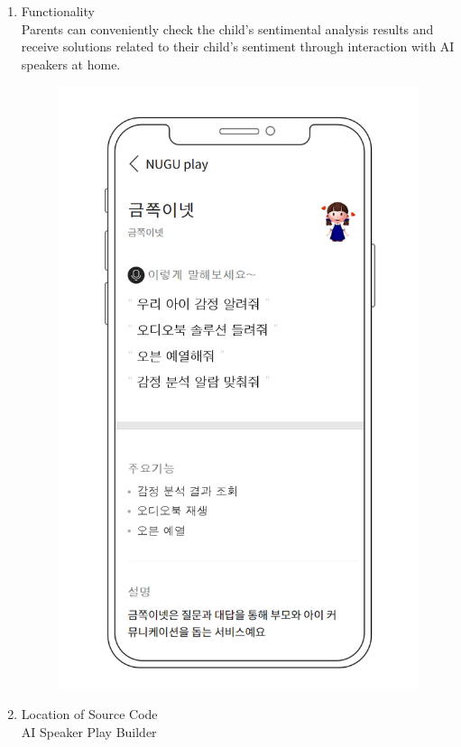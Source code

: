 \documentclass[conference]{IEEEtran}
\begin{document}
\begin{enumerate}
\begin{enumerate}
            \item Functionality
            \\ Parents can conveniently check the child's sentimental analysis results and receive solutions related to their child's sentiment through interaction with AI speakers at home.
            \begin{figure}[H]
            \centering
            \includegraphics[scale=0.3]{new_assets/nugu-play-1.png}
            \end{figure}
            
            \item Location of Source Code
            \\AI Speaker Play Builder
            

\end{enumerate}
\end{enumerate}
\end{document}
